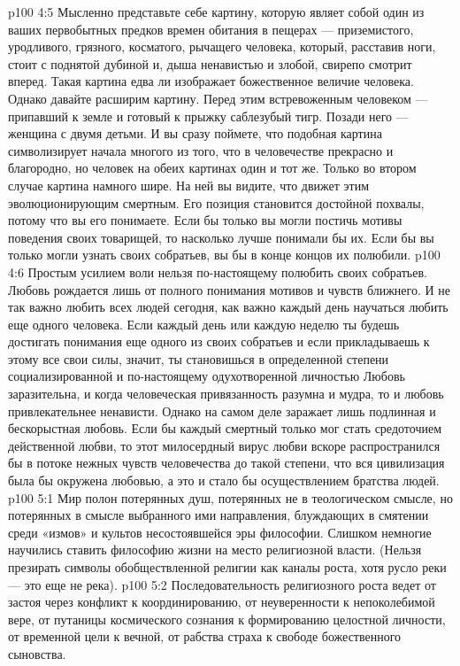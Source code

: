 \vs p100 4:5 Мысленно представьте себе картину, которую являет собой один из ваших первобытных предков времен обитания в пещерах --- приземистого, уродливого, грязного, косматого, рычащего человека, который, расставив ноги, стоит с поднятой дубиной и, дыша ненавистью и злобой, свирепо смотрит вперед. Такая картина едва ли изображает божественное величие человека. Однако давайте расширим картину. Перед этим встревоженным человеком --- припавший к земле и готовый к прыжку саблезубый тигр. Позади него --- женщина с двумя детьми. И вы сразу поймете, что подобная картина символизирует начала многого из того, что в человечестве прекрасно и благородно, но человек на обеих картинах один и тот же. Только во втором случае картина намного шире. На ней вы видите, что движет этим эволюционирующим смертным. Его позиция становится достойной похвалы, потому что вы его понимаете. Если бы только вы могли постичь мотивы поведения своих товарищей, то насколько лучше понимали бы их. Если бы вы только могли узнать своих собратьев, вы бы в конце концов их полюбили.
\vs p100 4:6 Простым усилием воли нельзя по\hyp{}настоящему полюбить своих собратьев. Любовь рождается лишь от полного понимания мотивов и чувств ближнего. И не так важно любить всех людей сегодня, как важно каждый день научаться любить еще одного человека. Если каждый день или каждую неделю ты будешь достигать понимания еще одного из своих собратьев и если прикладываешь к этому все свои силы, значит, ты становишься в определенной степени социализированной и по\hyp{}настоящему одухотворенной личностью Любовь заразительна, и когда человеческая привязанность разумна и мудра, то и любовь привлекательнее ненависти. Однако на самом деле заражает лишь подлинная и бескорыстная любовь. Если бы каждый смертный только мог стать средоточием действенной любви, то этот милосердный вирус любви вскоре распространился бы в потоке нежных чувств человечества до такой степени, что вся цивилизация была бы окружена любовью, а это и стало бы осуществлением братства людей.
\vs p100 5:1 Мир полон потерянных душ, потерянных не в теологическом смысле, но потерянных в смысле выбранного ими направления, блуждающих в смятении среди «измов» и культов несостоявшейся эры философии. Слишком немногие научились ставить философию жизни на место религиозной власти. (Нельзя презирать символы обобществленной религии как каналы роста, хотя русло реки --- это еще не река).
\vs p100 5:2 Последовательность религиозного роста ведет от застоя через конфликт к координированию, от неуверенности к непоколебимой вере, от путаницы космического сознания к формированию целостной личности, от временной цели к вечной, от рабства страха к свободе божественного сыновства.
